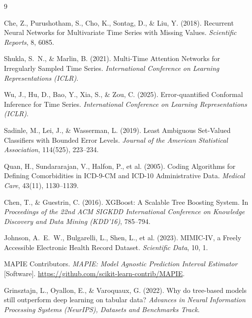 \documentclass[11pt]{article}
\begin{document}
\begin{thebibliography}{9}

Che, Z., Purushotham, S., Cho, K., Sontag, D., \& Liu, Y. (2018).
Recurrent Neural Networks for Multivariate Time Series with Missing Values.
\emph{Scientific Reports}, 8, 6085.

Shukla, S.~N., \& Marlin, B. (2021).
Multi-Time Attention Networks for Irregularly Sampled Time Series.
\emph{International Conference on Learning Representations (ICLR)}.

Wu, J., Hu, D., Bao, Y., Xia, S., \& Zou, C. (2025).
Error-quantified Conformal Inference for Time Series.
\emph{International Conference on Learning Representations (ICLR)}.

Sadinle, M., Lei, J., \& Wasserman, L. (2019).
Least Ambiguous Set-Valued Classifiers with Bounded Error Levels.
\emph{Journal of the American Statistical Association}, 114(525), 223--234.

Quan, H., Sundararajan, V., Halfon, P., et al. (2005).
Coding Algorithms for Defining Comorbidities in ICD-9-CM and ICD-10 Administrative Data.
\emph{Medical Care}, 43(11), 1130--1139.

Chen, T., \& Guestrin, C. (2016).
XGBoost: A Scalable Tree Boosting System.
In \emph{Proceedings of the 22nd ACM SIGKDD International Conference on Knowledge Discovery and Data Mining (KDD'16)}, 785--794.

Johnson, A.~E.~W., Bulgarelli, L., Shen, L., et al. (2023).
MIMIC-IV, a Freely Accessible Electronic Health Record Dataset.
\emph{Scientific Data}, 10, 1.

MAPIE Contributors. \emph{MAPIE: Model Agnostic Prediction Interval Estimator} [Software]. \url{https://github.com/scikit-learn-contrib/MAPIE}.

Grinsztajn, L., Oyallon, E., \& Varoquaux, G. (2022).
Why do tree-based models still outperform deep learning on tabular data?
\emph{Advances in Neural Information Processing Systems (NeurIPS), Datasets and Benchmarks Track}.

\end{thebibliography}
\end{document}
